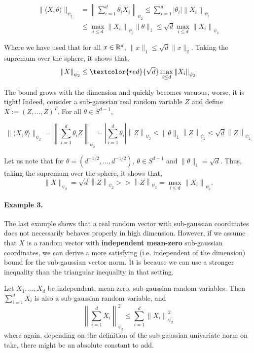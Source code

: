 \documentclass{article}
\begin{document}
\begin{equation*}
  \begin{aligned}
    \|\langle X, \theta\rangle\|_{\psi_{2}} &=\left\|\sum_{i=1}^{d} \theta_{i} X_{i}\right\|_{\psi_{2}} \leq \sum_{i=1}^{d} |\theta_{i}|\left\|X_{i}\right\|_{\psi_{2}}\\
    & \leq \max_{i \leq d}\left\|X_{i}\right\|_{\psi_{2}} \|\theta\|_1 \leq \sqrt{d}  \max_{i \leq d}\left\|X_{i}\right\|_{\psi_{2}}
  \end{aligned}
\end{equation*}

Where we have used that for all $x \in \mathbb{R}^{d}$, $\|x\|_1 \leq \sqrt{d}\|x\|_2$. Taking the supremum over the sphere, it shows that, $$\left\|X\right\|_{\psi_{2}} \leq \textcolor{red}{\sqrt{d}}  \max_{i \leq d}\left\|X_{i}\right\|_{\psi_{2}}$$

The bound grows with the dimension and quickly becomes vacuous, worse, it
is tight! Indeed, consider a sub-gaussian real random variable $Z$ and define $X:=
(Z,\ldots,Z)^T$. For all $\theta \in S^{d-1}$,

\begin{equation*}
  \|\langle X, \theta\rangle\|_{\psi_{2}} =\left\|\sum_{i=1}^{d} \theta_{i} Z\right\|_{\psi_{2}} = \left| \sum_{i=1}^d \theta_i \right|\left\|Z\right\|_{\psi_{2}} \leq \|\theta\|_1\left\|Z\right\|_{\psi_{2}} \leq \sqrt{d} \left\|Z\right\|_{\psi_{2}}
\end{equation*}

Let us note that for $\theta = (d^{-1/2}, \ldots, d^{-1/2})$,
$\theta \in S^{d-1}$ and $\|\theta\|_1 = \sqrt{d}$. Thus, taking the supremum over the
sphere, it shows that, $$\| X\|_{\psi_{2}} = \sqrt{d}\left\|Z\right\|_{\psi_{2}}
>> \left\|Z\right\|_{\psi_{2}} = \max_{i \leq d}\left\|X_{i}\right\|_{\psi_{2}}.$$

\paragraph{Example 3.} The last example shows that a real random vector with
sub-gaussian coordinates does not necessarily behaves properly in high
dimension. However, if we assume that $X$ is a random vector with \textbf{independent mean-zero}
sub-gaussian coordinates, we can derive a more satisfying (i.e. independent
of the dimension) bound for the sub-gaussian vector norm. It is because we can
use a stronger inequality than the triangular inequality in that setting.

\begin{prop} Let
  $X_{1}, \ldots, X_{d}$ be independent, mean zero, sub-gaussian random variables. Then $\sum_{i=1}^{d} X_{i}$ is also a sub-gaussian random variable, and
  $$
  \left\|\sum_{i=1}^{d} X_{i}\right\|_{\psi_{2}}^{2} \leq \sum_{i=1}^{d}\left\|X_{i}\right\|_{\psi_{2}}^{2}
  $$
  where again, depending on the definition of the sub-gaussian
  univariate norm on take, there might be an absolute constant to add.
\end{prop}
\end{document}

